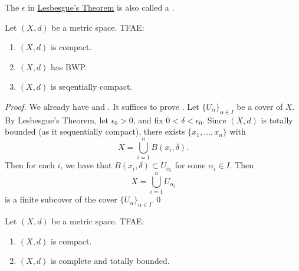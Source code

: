 \documentclass[notoc,notitlepage]{tufte-book}
\begin{document}
\begin{note}
  The $\epsilon$ in \hyperref[thm:lesbesgue]{Lesbesgue's Theorem} is also called a .
\end{note}

\begin{thm}\label{thm:lesbesgue_borel}
  Let $(X, d)$ be a metric space. TFAE:
  \begin{enumerate}
    \item $(X, d)$ is compact.
    \item $(X, d)$ has BWP.
    \item $(X, d)$ is seqentially compact.
  \end{enumerate}
\end{thm}

\begin{proof}
  We already have  and . It suffices to prove . Let $\{ U_\alpha \}_{\alpha \in I}$ be a cover of $X$. By Lesbesgue's Theorem, let $\epsilon_0 > 0$, and fix $0 < \delta < \epsilon_0$. Since $(X, d)$ is totally bounded (as it sequentially compact), there exists $\{ x_1, \ldots, x_n \}$ with
    \begin{equation*}
      X = \bigcup_{i=1}^{n} B (x_i, \delta).
    \end{equation*}
    Then for each $i$, we have that $B(x_i, \delta) \subset U_{\alpha_i}$ for some $\alpha_i \in I$. Then
    \begin{equation*}
      X = \bigcup_{i=1}^{n} U_{\alpha_i}
    \end{equation*}
    is a finite subcover of the cover $\{ U_\alpha \}_{\alpha \in I}$.\qed\
\end{proof}

\begin{thm}\label{thm:compactness_iff_completeness_totally_bounded}
    Let $(X, d)$ be a metric space. TFAE:
    \begin{enumerate}
      \item $(X, d)$ is compact.
      \item $(X, d)$ is complete and totally bounded.
    \end{enumerate}
\end{thm}
\end{document}
